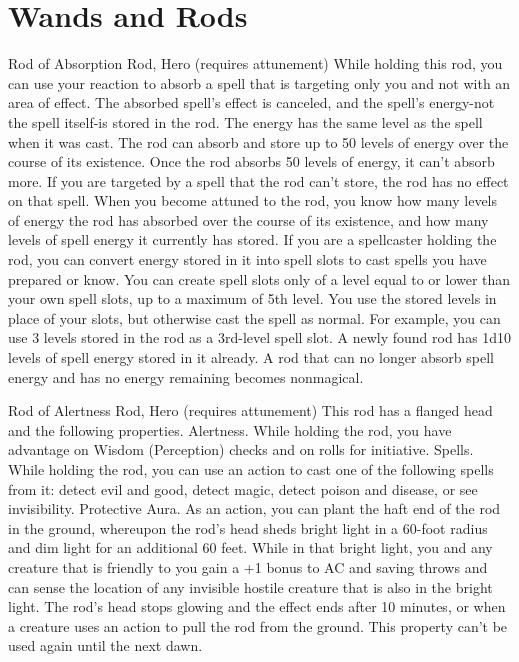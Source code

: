\section{Wands and Rods}\label{mi:wands}

Rod of Absorption
Rod, Hero (requires attunement)
While holding this rod, you can use your reaction to absorb a spell that is targeting only you and not with an area of effect. The absorbed spell's effect is canceled, and the spell's energy-not the spell itself-is stored in the rod. The energy has the same level as the spell when it was cast. The rod can absorb and store up to 50 levels of energy over the course of its existence. Once the rod absorbs 50 levels of energy, it can't absorb more. If you are targeted by a spell that the rod can't store, the rod has no effect on that spell.
When you become attuned to the rod, you know how many levels of energy the rod has absorbed over the course of its existence, and how many levels of spell energy it currently has stored.
If you are a spellcaster holding the rod, you can convert energy stored in it into spell slots to cast spells you have prepared or know. You can create spell slots only of a level equal to or lower than your own spell slots, up to a maximum of 5th level. You use the stored levels in place of your slots, but otherwise cast the spell as normal. For example, you can use 3 levels stored in the rod as a 3rd-level spell slot.
A newly found rod has 1d10 levels of spell energy stored in it already. A rod that can no longer absorb spell energy and has no energy remaining becomes nonmagical.

Rod of Alertness
Rod, Hero (requires attunement) This rod has a flanged head and the following properties.
Alertness. While holding the rod, you have advantage on Wisdom (Perception) checks and on rolls for initiative.
Spells. While holding the rod, you can use an action to cast one of the following spells from it: detect evil and good, detect magic, detect poison and disease, or see invisibility.
Protective Aura. As an action, you can plant the haft end of the rod in the ground, whereupon the rod's head sheds bright light in a 60-foot radius and dim light for an additional 60 feet. While in that bright light, you and any creature that is friendly to you gain a +1 bonus to AC and saving throws and can sense the location of any invisible hostile creature that is also in the bright light.  The rod's head stops glowing and the effect ends after 10 minutes, or when a creature uses an action to pull the rod from the ground. This property can't be used again until the next dawn.

